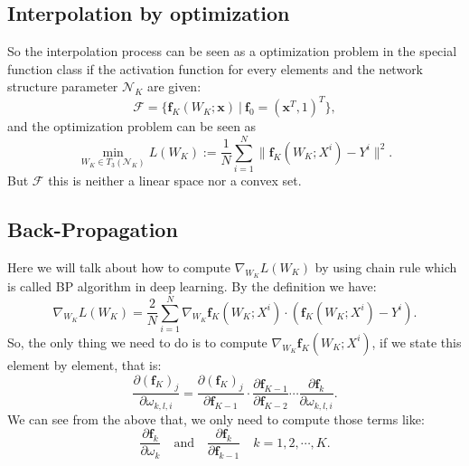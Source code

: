 \subsection{Interpolation by optimization}
So the  interpolation process can be seen as a optimization problem in the special function class if the activation function for every elements and  the network structure parameter $\mathcal{N}_K$ are given:
\begin{equation}
    \mathcal{F} = \{\bm{f}_K(W_K;\bm{x}) ~|~  \bm{f}_0 = (\bm{x}^{T},1)^{T}\},
\end{equation}
and the optimization problem can be seen as
\begin{equation}
    \mathop{\min}_{W_K \in T_3(\mathcal{N}_K)}  L(W_K) := \frac{1}{N}\sum_{i=1}^N \|\bm{f}_K(W_K; X^i) - Y^i\|^2.
\end{equation}
But $\mathcal{F}$ this is neither a linear space nor a convex set.




\subsection{Back-Propagation}
Here we will talk about how to compute $\nabla_{W_K} L(W_K)$ by using chain rule which is called BP algorithm in deep learning. By the definition we have:
\begin{equation}
    \nabla_{W_K} L(W_K) = \frac{2}{N} \sum_{i=1}^{N} \nabla_{W_K}\bm{f}_K(W_K; X^i) \cdot (\bm{f}_K(W_K;X^i) - Y^i) . 
\end{equation}
So, the only thing we need to do is to compute $\nabla_{W_K}\bm{f}_K(W_K; X^i)$, if we state this element by element, that is: 
\begin{equation}
    \frac{\partial (\bm{f}_K)_j}{ \partial \omega_{k,l,i}} = \frac{\partial (\bm{f}_K)_j}{\partial \bm{f}_{K-1}} \cdot \frac{ \partial \bm{f}_{K-1}}{\partial \bm{f}_{K-2}} \cdots \frac{ \partial \bm{f}_k}{\partial \omega_{k,l,i}}.
\end{equation}
We can see from the above that, we only need to compute those terms like:
\begin{equation}
    \frac{ \partial \bm{f}_k}{\partial \omega_{k}}  \quad \text{and} \quad \frac{\partial \bm{f}_k}{\partial \bm{f}_{k-1}}  \quad k = 1,2,\cdots,K. 
\end{equation}


